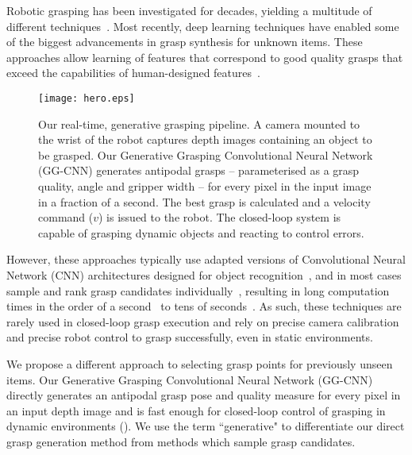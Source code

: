 \documentclass[conference]{IEEEtran}
\begin{document}
Robotic grasping has been investigated for decades, yielding a multitude of different techniques~\cite{bicchi2000robotic, bohg2014data, sahbani2012overview, shimoga1996robot}.  Most recently, deep learning techniques have enabled some of the biggest advancements in grasp synthesis for unknown items.  These approaches allow learning of features that correspond to good quality grasps that exceed the capabilities of human-designed features~\cite{Johns2016DeepUncertainty, Lenz2015DeepGrasps, Mahler2017Dex2,Pinto2016SupersizingHours}.  

\begin{figure}[tpb]
    \centering
    \texttt{[image: hero.eps]}
    \vspace{-5mm}
    \caption{Our real-time, generative grasping pipeline.  A camera mounted to the wrist of the robot captures depth images containing an object to be grasped. Our Generative Grasping Convolutional Neural Network (GG-CNN) generates antipodal grasps -- parameterised as a grasp quality, angle and gripper width -- for every pixel in the input image in a fraction of a second.  The best grasp is calculated and a velocity command ($v$) is issued to the robot. 
    The closed-loop system is capable of grasping dynamic objects and reacting to control errors.
    }
  \label{fig:hero} 
  \vspace{-6mm}
\end{figure}

However, these approaches typically use adapted versions of Convolutional Neural Network (CNN) architectures designed for object recognition~\cite{Johns2016DeepUncertainty,Kumra2017RoboticNetworks, Pinto2016SupersizingHours,Redmon2015Real-timeNetworks}, and in most cases sample and rank grasp candidates individually~\cite{Lenz2015DeepGrasps, Mahler2017Dex2, Pinto2016SupersizingHours}, resulting in long computation times in the order of a second~\cite{Mahler2017Dex2} to tens of seconds~\cite{Lenz2015DeepGrasps}.  As such, these techniques are rarely used in closed-loop grasp execution and rely on precise camera calibration and precise robot control to grasp successfully, even in static environments. 

We propose a different approach to selecting grasp points for previously unseen items.  Our Generative Grasping Convolutional Neural Network (GG-CNN) directly generates an antipodal grasp pose and quality measure for every pixel in an input depth image and is fast enough for closed-loop control of grasping in dynamic environments ().  We use the term ``generative" to differentiate our direct grasp generation method from methods which sample grasp candidates.
\end{document}
